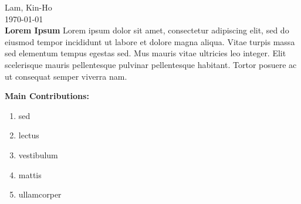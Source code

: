 \documentclass[12pt]{article}
\begin{document}
Lam, Kin-Ho \\
\today \\

\textbf{Lorem Ipsum}
Lorem ipsum dolor sit amet, consectetur adipiscing elit, sed do eiusmod tempor incididunt ut labore et dolore magna aliqua. Vitae turpis massa sed elementum tempus egestas sed. Mus mauris vitae ultricies leo integer. Elit scelerisque mauris pellentesque pulvinar pellentesque habitant. Tortor posuere ac ut consequat semper viverra nam.
\cite{https://doi.org/10.48550/arxiv.2109.13978}


\textbf{Main Contributions:}
\vspace{-5mm}
\begin{enumerate}
    \item sed 
    \item lectus 
    \item vestibulum 
    \item mattis 
    \item ullamcorper

\end{enumerate}

\printbibliography
\end{document}
